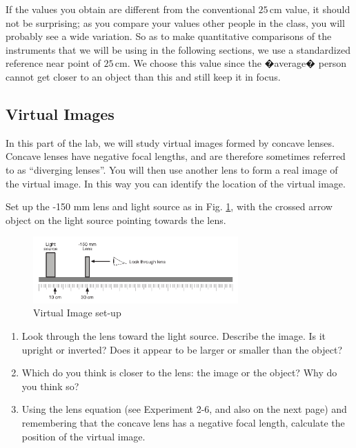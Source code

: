 If the values you obtain are different from the conventional $25\, \textrm{cm}$ value, it should not be surprising; as you compare your values other people in the class, you will probably see a wide variation. So as to make quantitative comparisons of the instruments that we will be using in the following sections, we use a standardized reference near point of $25\, \textrm{cm}$. We choose this value since the �average� person cannot get closer to an object than this and still keep it in focus.

\subsection{Virtual Images}

In this part of the lab, we will study virtual images formed by concave lenses. Concave lenses have negative focal lengths, and are therefore sometimes referred to as ``diverging lenses''. You will then use
another lens to form a real image of the virtual image. In this way you can identify the
location of the virtual image.\myskip

Set up the -150 mm lens and light source as in Fig. \ref{virt1}, with the crossed arrow object on the light source pointing towards the lens.

\begin{figure}[h]
\centering
\includegraphics[width=0.7\textwidth]{./Exp7/pic/virtual-1.png}
\caption{Virtual Image set-up}
\label{virt1}
\end{figure}

\begin{enumerate}
\item Look through the lens toward the light source. Describe the
image. Is it upright or inverted? Does it appear to be larger or smaller than the
object?

\item Which do you think is closer to the lens: the image or the object? Why do you
think so?

\item Using the lens equation (see Experiment 2-6, and also on the next page) and remembering that the concave lens has a negative focal length, calculate the position of the virtual image.
\end{enumerate}

